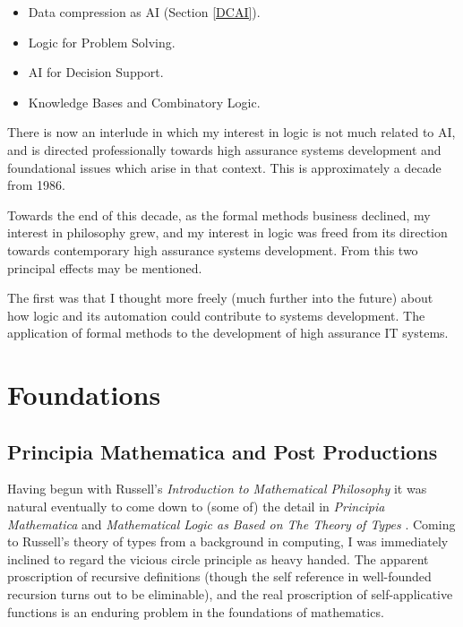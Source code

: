 \begin{itemize}
\item[] Data compression as AI (Section \ref{DCAI}).
\item[] Logic for Problem Solving.
\item[] AI for Decision Support.
\item[] Knowledge Bases and Combinatory Logic.
\end{itemize}

There is now an interlude in which my interest in logic is not much related to AI, and is directed professionally towards high assurance systems development and foundational issues which arise in that context.
This is approximately a decade from 1986.

Towards the end of this decade, as the formal methods business declined, my interest in philosophy grew, and my interest in logic was freed from its direction towards contemporary high assurance systems development.
From this two principal effects may be mentioned.

The first was that I thought more freely (much further into the future) about how logic and its automation could contribute to systems development.
The application of formal methods to the development of high assurance IT systems.

\chapter{Foundations}

\section{Principia Mathematica and Post Productions}

Having begun with Russell's \emph{Introduction to Mathematical Philosophy} \cite{russell10} it was natural eventually to come down to (some of) the detail in \emph{Principia Mathematica} \cite{russell10} and \emph{Mathematical Logic as Based on The Theory of Types} \cite{russell1908}.
Coming to Russell's theory of types from a background in computing, I was immediately inclined to regard the vicious circle principle as heavy handed.
The apparent proscription of recursive definitions (though the self reference in well-founded recursion turns out to be eliminable), and the real proscription of self-applicative functions is an enduring problem in the foundations of mathematics.

